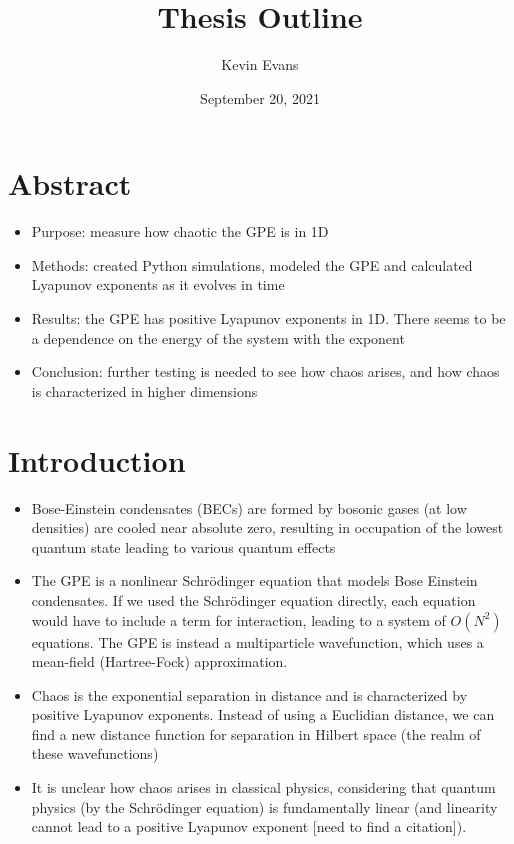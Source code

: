 \documentclass{homework}
\title{Thesis Outline}
\author{Kevin Evans}
\date{September 20, 2021}
\begin{document}
	\maketitle
	
	\section*{Abstract}
	\begin{itemize}
		\item Purpose: measure how chaotic the GPE is in 1D
		\item Methods: created Python simulations, modeled the GPE and calculated Lyapunov exponents as it evolves in time
		\item Results: the GPE has positive Lyapunov exponents in 1D. There seems to be a dependence on the energy of the system with the exponent
		\item Conclusion: further testing is needed to see how chaos arises, and how chaos is characterized in higher dimensions
	\end{itemize}
	
	\section{Introduction}
	\begin{itemize}

		
		\item Bose-Einstein condensates (BECs) are formed by bosonic gases (at low densities) are cooled near absolute zero, resulting in occupation of the lowest quantum state leading to various quantum effects
		\item The GPE is a nonlinear Schr\"odinger equation that models Bose Einstein condensates. If we used the Schr\"odinger equation directly, each equation would have to include a term for interaction, leading to a system of $O(N^2)$ equations. The GPE is instead a multiparticle wavefunction, which uses a mean-field (Hartree-Fock) approximation.
		
		\item Chaos is the exponential separation in distance and is characterized by positive Lyapunov exponents. Instead of using a Euclidian distance, we can find a new distance function for separation in Hilbert space (the realm of these wavefunctions)
		
		\item It is unclear how chaos arises in classical physics, considering that quantum physics (by the Schr\"odinger equation) is fundamentally linear (and linearity cannot lead to a positive Lyapunov exponent [need to find a citation]). 
		
	\end{itemize}
	
\end{document}

